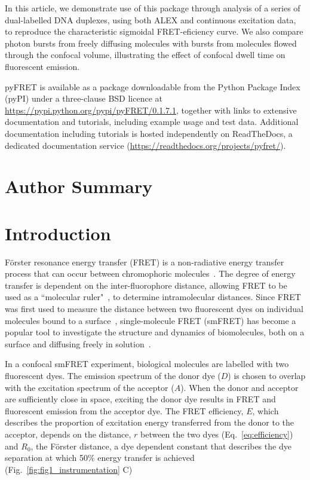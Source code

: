 \documentclass[10pt]{article}
\begin{document}
In this article, we demonstrate use of this package through analysis of a series of dual-labelled DNA duplexes, using both ALEX and continuous excitation data, to reproduce the characteristic sigmoidal FRET-eficiency curve. We also compare photon bursts from freely diffusing molecules with bursts from molecules flowed through the confocal volume, illustrating the effect of confocal dwell time on fluorescent emission.  

pyFRET is available as a package downloadable from the Python Package Index (pyPI) under a three-clause BSD licence at \url{https://pypi.python.org/pypi/pyFRET/0.1.7.1}, together with links to extensive documentation and tutorials, including example usage and test data. Additional documentation including tutorials is hosted independently on ReadTheDocs, a dedicated documentation service (\url{https://readthedocs.org/projects/pyfret/}).

\section*{Author Summary}

\section*{Introduction}
F\"{o}rster resonance energy transfer (FRET) is a non-radiative energy transfer process that can occur between chromophoric molecules~\cite{forster48}. The degree of energy transfer is dependent on the inter-fluorophore distance, allowing FRET to be used as a ``molecular ruler"~\cite{stryer67}, to determine intramolecular distances. Since FRET was first used to measure the distance between two fluorescent dyes on individual molecules bound to a surface~\cite{ha96}, single-molecule FRET (smFRET) has become a popular tool to investigate the structure and dynamics of biomolecules, both on a surface and diffusing freely in solution~\cite{haran03, schuler02, weiss00}.

In a confocal smFRET experiment, biological molecules are labelled with two fluorescent dyes. The emission spectrum of the donor dye ($D$) is chosen to overlap with the excitation spectrum of the acceptor ($A$). When the donor and acceptor are sufficiently close in space, exciting the donor dye results in FRET and fluorescent emission from the acceptor dye. The FRET efficiency, $E$, which describes the proportion of excitation energy transferred from the donor to the acceptor, depends on the distance, $r$ between the two dyes (Eq.~\ref{eq:efficiency}) and $R_0$, the F\"{o}rster distance, a dye dependent constant that describes the dye separation at which 50\% energy transfer is achieved (Fig.~\ref{fig:fig1_instrumentation} C)
\end{document}
